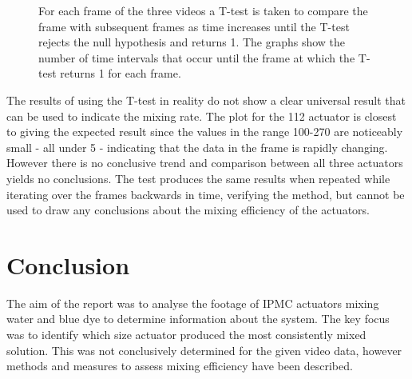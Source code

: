 \begin{figure}[H]
    \center
  
     \caption{For each frame of the three videos a T-test is taken to compare the frame with subsequent frames as time increases until the T-test rejects the null hypothesis and returns 1. The graphs show the number of time intervals that occur until the frame at which the T-test returns 1 for each frame. }
    

\end{figure}


The results of using the T-test in reality do not show a clear universal result that can be used to indicate the mixing rate. The plot for the 112 actuator is closest to giving the expected result since the values in the range 100-270 are noticeably small - all under 5 - indicating that the data in the frame is rapidly changing. However there is no conclusive trend and comparison between all three actuators yields no conclusions. The test produces the same results when repeated while iterating over the frames backwards in time, verifying the method, but cannot be used to draw any conclusions about the mixing efficiency of the actuators.


\section{Conclusion}

The aim of the report was to analyse the footage of IPMC actuators mixing water and blue dye to determine information about the system. The key focus was to identify which size actuator produced the most consistently mixed solution. This was not conclusively determined for the given video data, however methods and measures to assess mixing efficiency have been described.

